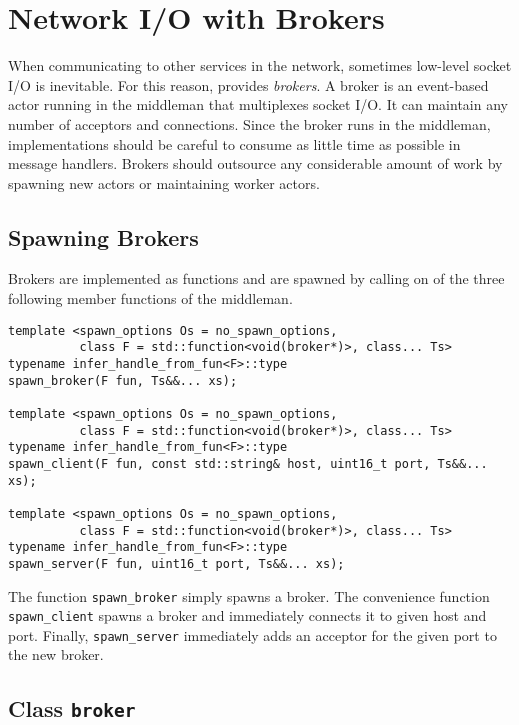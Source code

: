 \section{Network I/O with Brokers}
\label{broker}

When communicating to other services in the network, sometimes low-level socket I/O is inevitable.
For this reason, \lib provides \emph{brokers}.
A broker is an event-based actor running in the middleman that multiplexes socket I/O.
It can maintain any number of acceptors and connections.
Since the broker runs in the middleman, implementations should be careful to consume as little time as possible in message handlers.
Brokers should outsource any considerable amount of work by spawning new actors or maintaining worker actors.

\subsection{Spawning Brokers}

Brokers are implemented as functions and are spawned by calling on of the three following member functions of the middleman.

\begin{lstlisting}
template <spawn_options Os = no_spawn_options,
          class F = std::function<void(broker*)>, class... Ts>
typename infer_handle_from_fun<F>::type
spawn_broker(F fun, Ts&&... xs);

template <spawn_options Os = no_spawn_options,
          class F = std::function<void(broker*)>, class... Ts>
typename infer_handle_from_fun<F>::type
spawn_client(F fun, const std::string& host, uint16_t port, Ts&&... xs);

template <spawn_options Os = no_spawn_options,
          class F = std::function<void(broker*)>, class... Ts>
typename infer_handle_from_fun<F>::type
spawn_server(F fun, uint16_t port, Ts&&... xs);
\end{lstlisting}

The function \lstinline^spawn_broker^ simply spawns a broker. The convenience function \lstinline^spawn_client^ spawns a broker and immediately connects it to given host and port. Finally, \lstinline^spawn_server^ immediately adds an acceptor for the given port to the new broker.

\subsection{Class \texttt{broker}}
\label{broker-class}

